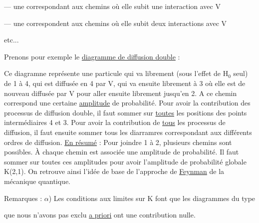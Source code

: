 — une correspondant aux chemins où elle subit une interaction avec V

— une correspondent aux chemins où elle subit deux interactions avec V

etc...

Prenons pour exemple le \ul{diagramme de diffusion double} :
\begin{center}
 \end{center}
Ce diagramne représente une particule qui va librement (sous l'effet de
H$_0$ seul) de 1 à 4, qui est diffusée en 4 par V, qui va ensuite librement
à 3 où elle est de nouveau diffusée par V pour aller ensuite librement
jusqu'en 2. A ce chemin correspond une certaine \ul{amplitude} de probabilité.
Pour avoir la contribution des processus de diffusion double, il faut
sommer sur \ul{toutes} les positions des points intermédiaires 4 et 3. Pour
avoir la contribution de \ul{tous} les processus de diffusion, il faut ensuite
sommer tous les diarramres correspondant aux différents ordres de diffusion.
\ul{En résumé} : Pour joindre 1 à 2, plusieurs chemins sont possibles. À chaque
chemin est associée une amplitude de probabilité. Il faut sommer sur toutes
ces amplitudes pour avoir l'amplitude de probabilité globale K(2,1).
On retrouve ainsi l'idée de base de l'approche de \ul{Feynman} de la mécanique
quantique.

Remarques : $\alpha$) Les conditions aux limites sur K font que les diagrammes du type
\begin{center}
 \end{center}
que nous n'avons pas exclu \ul{a priori} ont une contribution nulle.


